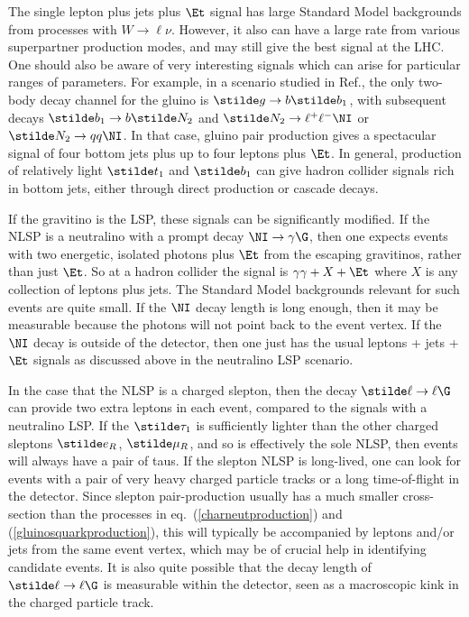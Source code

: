 The single lepton plus jets plus $\Et$ signal \cite{singlelepton}
has large
Standard
Model backgrounds from processes with $W\rightarrow\ell\nu$. However,
it also can have a large rate from various superpartner production modes,
and may still give the best signal at the LHC. One should also be
aware of very interesting signals which can arise for particular
ranges of parameters. For example, in a scenario studied in
Ref.\cite{snowmass96}, the only two-body decay channel for the gluino is
$\stilde g\rightarrow b\stilde b_1$, with subsequent decays
$\stilde b_1 \rightarrow b \stilde N_2$ and $\stilde N_2 \rightarrow
\ell^+\ell^-\NI$ or $\stilde N_2 \rightarrow q q \NI$. In
that case, gluino pair production
gives a spectacular signal of four bottom jets plus
up to four leptons plus $\Et$. In general, production of relatively
light $\stilde t_1$ and $\stilde b_1$ can give hadron collider
signals rich in bottom jets, either through direct production or cascade
decays.

If the gravitino is the LSP, these signals can be significantly
modified. If the NLSP is a neutralino with a prompt decay
$\NI\rightarrow \gamma\G$, then one expects events with two energetic,
isolated photons plus $\Et$ from the escaping gravitinos,
rather than just $\Et$.
So at a hadron collider the signal is $\gamma\gamma+X+\Et$ where $X$ is
any collection of
leptons plus jets. The Standard Model backgrounds
relevant for such events
are quite small. If
the $\NI$ decay length is long enough, then it may be
measurable because the photons will not point
back to the event vertex. If the $\NI$ decay is outside of the
detector, then one just has the usual leptons + jets + $\Et$ signals
as discussed above in the neutralino LSP scenario.

In the case that
the NLSP is a charged slepton, then the decay $\stilde \ell
\rightarrow \ell\G$ can provide two extra leptons in each event,
compared to the signals with a neutralino LSP. If the $\stilde \tau_1$
is sufficiently
lighter than the other charged sleptons $\stilde e_R$,
$\stilde \mu_R$,
and so is effectively the sole NLSP, then events will always have a pair
of taus. If the slepton NLSP
is long-lived, one can look for events with
a pair of very heavy charged particle tracks or a long time-of-flight
in the detector.
Since slepton
pair-production usually has a much smaller cross-section than
the processes in eq.~(\ref{charneutproduction}) and
(\ref{gluinosquarkproduction}), this will typically be accompanied by
leptons and/or jets from the same event vertex, which may be of crucial
help in identifying candidate events.
It is also quite possible
that the decay length of $\stilde \ell \rightarrow \ell\G$ is measurable
within the detector, seen as a macroscopic kink in the charged
particle track.

